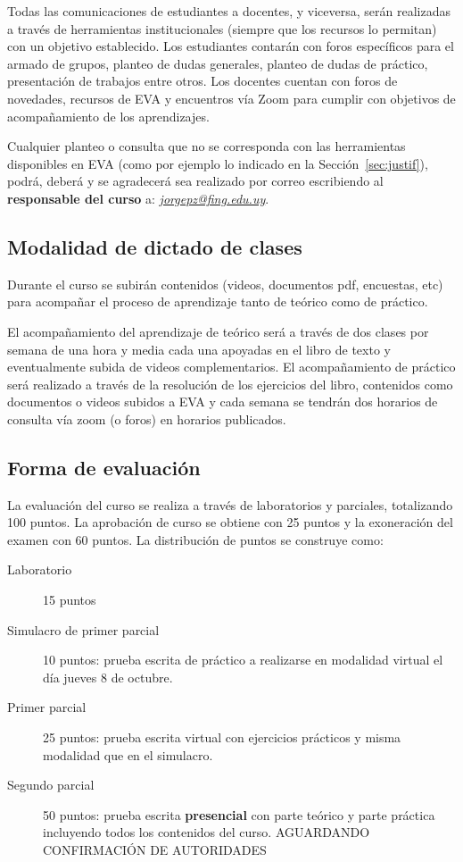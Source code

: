 \documentclass[a4paper,11pt,twocolumn]{article}
\begin{document}
Todas las comunicaciones de estudiantes a docentes, y viceversa, serán realizadas a través de herramientas institucionales (siempre que los recursos lo permitan) con un objetivo establecido. Los estudiantes contarán con foros específicos para el armado de grupos, planteo de dudas generales, planteo de dudas de práctico, presentación de trabajos entre otros. Los docentes cuentan con foros de novedades, recursos de EVA y encuentros vía Zoom para cumplir con objetivos de acompañamiento de los aprendizajes.

Cualquier planteo o consulta que no se corresponda con las herramientas disponibles en EVA (como por ejemplo lo indicado en la Sección~\ref{sec:justif}), podrá, deberá y se agradecerá sea realizado por correo escribiendo al \textbf{responsable del curso} a: \textit{\href{mailto:jorgepz@fing.edu.uy}{jorgepz@fing.edu.uy}}.

\subsection{Modalidad de dictado de clases}

Durante el curso se subirán contenidos (videos, documentos pdf, encuestas, etc)  para acompañar el proceso de aprendizaje tanto de teórico como de práctico.

El acompañamiento del aprendizaje de teórico será a través 
de dos clases por semana de una hora y media cada una apoyadas en el libro de texto y eventualmente subida de videos complementarios. %
%
El acompañamiento de práctico será realizado a través de la resolución de los ejercicios del libro, contenidos como documentos o videos subidos a EVA y cada semana se tendrán dos horarios de consulta vía zoom (o foros) en horarios publicados.

\subsection{Forma de evaluación}

La evaluación del curso se realiza a través de laboratorios y parciales, totalizando 100 puntos. La aprobación de curso se obtiene con 25 puntos y la exoneración del examen con 60 puntos. %
%
La distribución de puntos se construye como:
%
\begin{description}
\item [Laboratorio] 15 puntos
%
\item [Simulacro de primer parcial] 10 puntos: prueba escrita de práctico  a realizarse en modalidad virtual el día jueves 8 de octubre.
%
\item [Primer parcial] 25 puntos: prueba escrita virtual con ejercicios prácticos y misma modalidad que en el simulacro.
%
\item [Segundo parcial] 50 puntos: prueba escrita \textbf{presencial} con parte teórico y parte práctica incluyendo todos los contenidos del curso.
{\color{red}
AGUARDANDO CONFIRMACIÓN DE AUTORIDADES}
\end{description}
\end{document}

